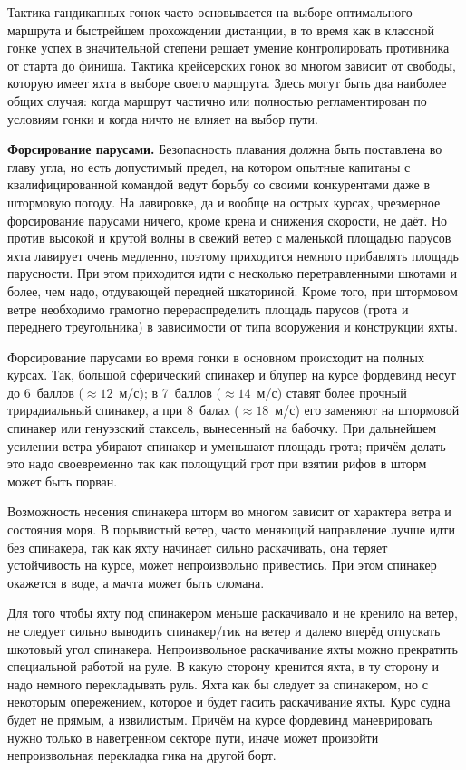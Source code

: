 Тактика гандикапных гонок часто основывается на выборе оптимального маршрута и быстрейшем прохождении дистанции, в то время как в классной гонке успех в значительной степени решает умение контролировать противника от старта до финиша. Тактика крейсерских гонок во многом зависит от свободы, которую имеет яхта в выборе своего маршрута. Здесь могут быть два наиболее общих случая: когда маршрут частично или полностью регламентирован по условиям гонки и когда ничто не влияет на выбор пути. 

\textbf{Форсирование парусами.} Безопасность плавания должна быть поставлена во главу угла, но есть допустимый предел, на котором опытные капитаны с квалифицированной командой ведут борьбу со своими конкурентами даже в штормовую погоду. На лавировке, да и вообще на острых курсах, чрезмерное форсирование парусами ничего, кроме крена и снижения скорости, не даёт. Но против высокой и крутой волны в свежий ветер с маленькой площадью парусов яхта лавирует очень медленно, поэтому приходится немного прибавлять площадь парусности. При этом приходится идти с несколько перетравленными шкотами и более, чем надо, отдувающей передней шкаториной. Кроме того, при штормовом ветре необходимо грамотно перераспределить площадь парусов (грота и переднего треугольника) в зависимости от типа вооружения и конструкции яхты.

Форсирование парусами во время гонки в основном происходит на полных курсах. Так, большой сферический спинакер и блупер на курсе фордевинд несут до 6~баллов ($\approx 12$~м/с); в 7~баллов ($\approx 14$~м/с) ставят более прочный трирадиальный спинакер, а при 8~балах ($\approx 18$~м/с) его заменяют на штормовой спинакер или генуэзский стаксель, вынесенный на бабочку. При дальнейшем усилении ветра убирают спинакер и уменьшают площадь грота; причём делать это надо своевременно так как полощущий грот при взятии рифов в шторм может быть порван.

Возможность несения спинакера шторм во многом зависит от характера ветра и состояния моря. В порывистый ветер, часто меняющий направление лучше идти без спинакера, так как яхту начинает сильно раскачивать, она теряет устойчивость на курсе, может непроизвольно привестись. При этом спинакер окажется в воде, а мачта может быть сломана.

Для того чтобы яхту под спинакером меньше раскачивало и не кренило на ветер, не следует сильно выводить спинакер\-/гик на ветер и далеко вперёд отпускать шкотовый угол спинакера. Непроизвольное раскачивание яхты можно прекратить специальной работой на руле. В какую сторону кренится яхта, в ту сторону и надо немного перекладывать руль. Яхта как бы следует за спинакером, но с некоторым опережением, которое и будет гасить раскачивание яхты. Курс судна будет не прямым, а извилистым. Причём на курсе фордевинд маневрировать нужно только в наветренном секторе пути, иначе может произойти непроизвольная перекладка гика на другой борт.

